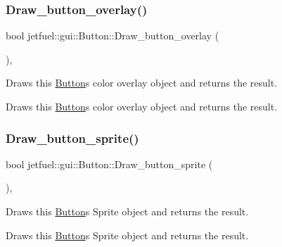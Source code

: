 \subsubsection{\texorpdfstring{Draw\+\_\+button\+\_\+overlay()}{Draw\_button\_overlay()}}
{\footnotesize\ttfamily bool jetfuel\+::gui\+::\+Button\+::\+Draw\+\_\+button\+\_\+overlay (\begin{DoxyParamCaption}{ }\end{DoxyParamCaption})\hspace{0.3cm}{\ttfamily [inline]}, {\ttfamily [protected]}}



Draws this \hyperlink{classjetfuel_1_1gui_1_1Button}{Button}\textquotesingle{}s color overlay object and returns the result. 

Draws this \hyperlink{classjetfuel_1_1gui_1_1Button}{Button}\textquotesingle{}s color overlay object and returns the result. \mbox{\label{classjetfuel_1_1gui_1_1Button_a548ffd5860aced3206da4c210b5496c9}} 
\subsubsection{\texorpdfstring{Draw\+\_\+button\+\_\+sprite()}{Draw\_button\_sprite()}}
{\footnotesize\ttfamily bool jetfuel\+::gui\+::\+Button\+::\+Draw\+\_\+button\+\_\+sprite (\begin{DoxyParamCaption}{ }\end{DoxyParamCaption})\hspace{0.3cm}{\ttfamily [inline]}, {\ttfamily [protected]}}



Draws this \hyperlink{classjetfuel_1_1gui_1_1Button}{Button}\textquotesingle{}s Sprite object and returns the result. 

Draws this \hyperlink{classjetfuel_1_1gui_1_1Button}{Button}\textquotesingle{}s Sprite object and returns the result. \mbox{\label{classjetfuel_1_1gui_1_1Button_ae001860ae9ce670073a4608811e70cfe}} 
